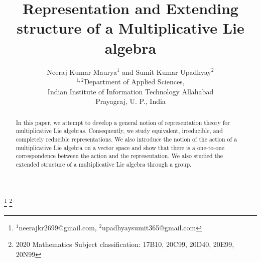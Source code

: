 \documentclass[10 pt,oneside,reqno,a4paper]{amsart}
\numberwithin{equation}{section}
\begin{document}
	\title{Representation and Extending structure of a Multiplicative Lie algebra}
    \author{ Neeraj Kumar Maurya$^{1}$ and Sumit Kumar Upadhyay$^{2}$ \vspace{.4cm}\\
				{$^{1,2}$Department of Applied Sciences,\\ Indian Institute of Information Technology Allahabad\\Prayagraj, U. P., India} }
	
		\thanks{$^1$neerajkr2699@gmail.com, $^2$upadhyaysumit365@gmail.com }
		\thanks {2020 Mathematics Subject classification: 17B10, 20C99, 20D40, 20E99, 20N99}


\begin{abstract}
In this paper, we attempt to develop a general notion of representation theory for multiplicative Lie algebras. Consequently, we study equivalent, irreducible, and completely reducible representations. We also introduce the notion of the action of a multiplicative Lie algebra on a vector space and show that there is a one-to-one correspondence between the action and the representation. We also studied the extended structure of a multiplicative Lie algebra through a group.
\end{abstract}
	\maketitle

\end{document}
